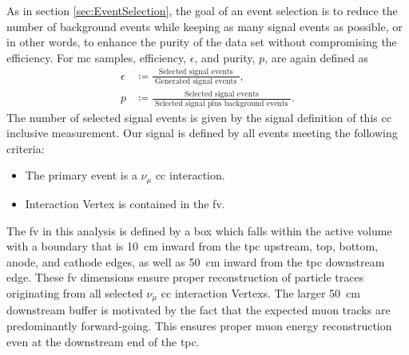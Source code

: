 As in section \ref{sec:EventSelection}, the goal of an event selection is to reduce the number of background events while keeping as many signal events as possible, or in other words, to enhance the purity of the data set without compromising the efficiency. For \gls{mc} samples, efficiency, $\epsilon$, and purity, $p$, are again defined as
\begin{align}
    \epsilon &\coloneqq \frac{\text{ Selected signal events }}{\text{ Generated signal events }}, \\
     p &\coloneqq \frac{\text{ Selected signal events }}{\text{ Selected signal plus background events }}.
\end{align}
The number of selected signal events is given by the signal definition of this \gls{cc} inclusive measurement. Our signal is defined by all events meeting the following criteria:
\begin{itemize}
    \item The primary event is a $\nu_{\mu}$ \gls{cc} interaction.
    \item Interaction \gls{Vertex} is contained in the \gls{fv}.
\end{itemize}
The \gls{fv} in this analysis is defined by a box which falls within the active volume with a boundary that is \SI{10}{\centi\metre} inward from the \gls{tpc} upstream, top, bottom, anode, and cathode edges, as well as \SI{50}{\centi\metre} inward from the \gls{tpc} downstream edge.
These \gls{fv} dimensions ensure proper reconstruction of particle traces originating from all selected $\nu_{\mu}$ \gls{cc} interaction \glspl{Vertex}. The larger \SI{50}{\centi\metre} downstream buffer is motivated by the fact that the expected muon tracks are predominantly forward-going. This ensures proper muon energy reconstruction even at the downstream end of the \gls{tpc}.

